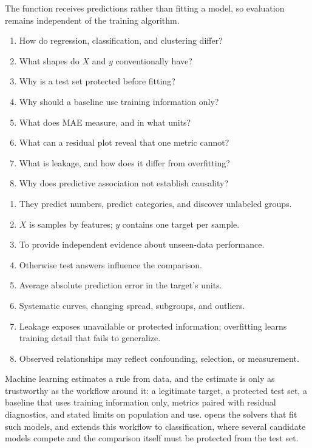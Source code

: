 The function receives predictions rather than fitting a model, so evaluation
remains independent of the training algorithm.


\begin{enumerate}
    \item How do regression, classification, and clustering differ?
    \item What shapes do $X$ and $y$ conventionally have?
    \item Why is a test set protected before fitting?
    \item Why should a baseline use training information only?
    \item What does MAE measure, and in what units?
    \item What can a residual plot reveal that one metric cannot?
    \item What is leakage, and how does it differ from overfitting?
    \item Why does predictive association not establish causality?
\end{enumerate}


\begin{enumerate}
    \item They predict numbers, predict categories, and discover unlabeled groups.
    \item $X$ is samples by features; $y$ contains one target per sample.
    \item To provide independent evidence about unseen-data performance.
    \item Otherwise test answers influence the comparison.
    \item Average absolute prediction error in the target's units.
    \item Systematic curves, changing spread, subgroups, and outliers.
    \item Leakage exposes unavailable or protected information; overfitting
          learns training detail that fails to generalize.
    \item Observed relationships may reflect confounding, selection, or measurement.
\end{enumerate}

\begin{tcolorbox}[title=Chapter summary,colframe=orange,colback=white,arc=2mm]
Machine learning estimates a rule from data, and the estimate is only as
trustworthy as the workflow around it: a legitimate target, a protected test
set, a baseline that uses training information only, metrics paired with
residual diagnostics, and stated limits on population and use.
 opens the solvers that fit such models, and
 extends this workflow to classification, where
several candidate models compete and the comparison itself must be protected
from the test set.
\end{tcolorbox}
